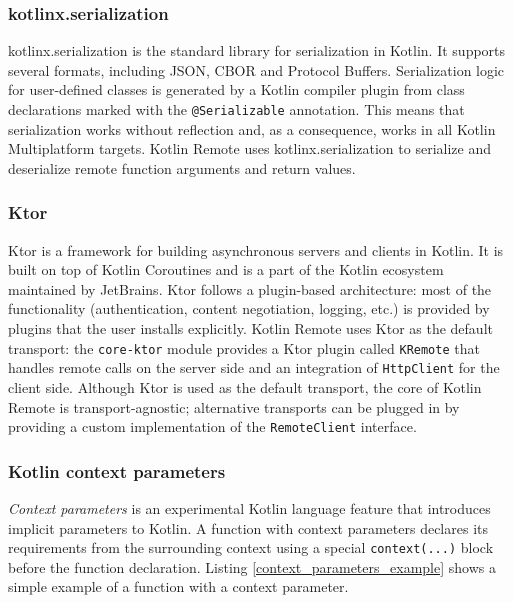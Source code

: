 \documentclass[a4paper,11pt,oneside]{article}
\newcommand{\term}[1]{\textit{#1}}
\newcommand{\kotlini}[1]{\texttt{#1}}
\newcommand{\ki}[1]{\kotlini{#1}}
\begin{document}
\subsubsection{kotlinx.serialization}

kotlinx.serialization \cite{noauthor_kotlinkotlinxserialization_2026} is the standard library for
serialization in Kotlin. It supports several formats, including JSON, CBOR and Protocol Buffers.
Serialization logic for user-defined classes is generated by a Kotlin compiler plugin from class
declarations marked with the \kotlini{@Serializable} annotation. This means that serialization works
without reflection and, as a consequence, works in all Kotlin Multiplatform targets. Kotlin Remote
uses kotlinx.serialization to serialize and deserialize remote function arguments and return
values.

\subsubsection{Ktor} \label{ktor-section}

Ktor \cite{noauthor_ktor_nodate} is a framework for building asynchronous servers and clients in
Kotlin. It is built on top of Kotlin Coroutines and is a part of the Kotlin ecosystem maintained by
JetBrains. Ktor follows a plugin-based architecture: most of the functionality (authentication,
content negotiation, logging, etc.) is provided by plugins that the user installs explicitly. Kotlin
Remote uses Ktor as the default transport: the \ki{core-ktor} module provides a Ktor plugin called
\kotlini{KRemote} that handles remote calls on the server side and an integration of
\kotlini{HttpClient} for the client side. Although Ktor is used as the default transport, the core
of Kotlin Remote is transport-agnostic; alternative transports can be plugged in by providing a
custom implementation of the \kotlini{RemoteClient} interface.

\subsubsection{Kotlin context parameters} \label{kotlin-context-parameters-section}

\term{Context parameters} \cite{noauthor_keepproposalskeep-0367-context-parametersmd_nodate} is an
experimental Kotlin language feature that introduces implicit parameters to Kotlin. A function with
context parameters declares its requirements from the surrounding context using a special
\kotlini{context(...)} block before the function declaration. Listing
\ref{context_parameters_example} shows a simple example of a function with a context parameter.
\end{document}
